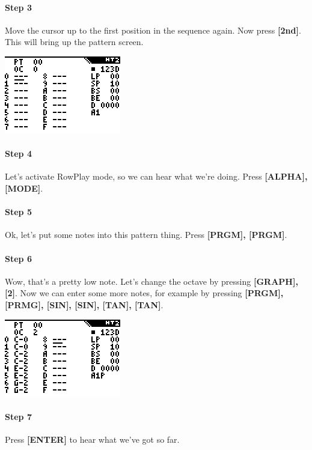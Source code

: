 \documentclass[12pt]{report}	%
\begin{document}
\paragraph{Step 3} Move the cursor up to the first position in the sequence again. Now press \textbf{[2nd]}. This will bring up the pattern screen. \newline

{\includegraphics{tut2}} \newline

\paragraph{Step 4} Let's activate RowPlay mode, so we can hear what we're doing. Press \textbf{[ALPHA], [MODE]}.
\paragraph{Step 5} Ok, let's put some notes into this pattern thing. Press \textbf{[PRGM], [PRGM]}.
\paragraph{Step 6} Wow, that's a pretty low note. Let's change the octave by pressing \textbf{[GRAPH], [2]}. Now we can enter some more notes, for example by pressing \textbf{[PRGM], [PRMG], [SIN], [SIN], [TAN], [TAN]}. \newline

{\includegraphics{tut3}} \newline

\paragraph{Step 7} Press \textbf{[ENTER]} to hear what we've got so far.
\end{document}
